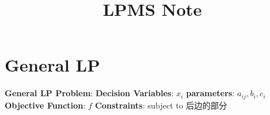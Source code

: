 \documentclass[9pt]{article}
\title{LPMS Note}
\author{}
\date{}
\begin{document}
\maketitle
\thispagestyle{fancy}
\vspace{-3.5cm}

\fontsize{10pt}{11pt}\selectfont
\setlength{\parindent}{8pt}


\section{General LP} %

\textbf{General LP Problem}: {\small \textbf{Decision Variables}: $x_i$ \quad \textbf{parameters}: $a_{ij},b_i,c_i$ \quad \textbf{Objective Function}: $f$ \quad \textbf{Constraints}: {\small subject to 后边的部分}}
\end{document}
